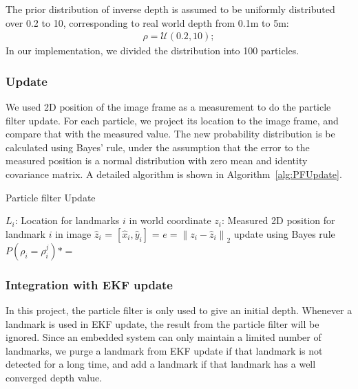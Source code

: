 \documentclass[conference]{IEEEtran}
\newcommand{\norm}[1]{\left\lVert#1\right\rVert}
\begin{document}
The prior distribution of inverse depth is assumed to be uniformly distributed over 0.2 to 10, corresponding to real world depth from 0.1m to 5m:
\begin{align*}
	\rho = \mathcal{U}(0.2, 10);
\end{align*}
In our implementation, we divided the distribution into 100 particles.

\subsubsection{Update}
We used 2D position of the image frame as a measurement to do the particle filter update. For each particle, we project its location to the image frame, and compare that with the measured value.
The new probability distribution is be calculated using Bayes' rule, under the assumption that the error to the measured position is a normal distribution with zero mean and identity covariance matrix.
A detailed algorithm is shown in Algorithm~\ref{alg:PFUpdate}.

\begin{algorithm}[H]
\caption{Particle filter Update}
\label{alg:PFUpdate}
    \begin{algorithmic}
    	\Statex {} {$L_i$: Location for landmarks $i$ in world coordinate}
        \Statex {} {$z_i$: Measured 2D position for landmark $i$ in image}
            		\State $\hat{z}_i$ = $[\hat{x}_i,\hat{y}_i]$ = 
                    \State $e = \norm{z_i-\hat{z}_i}_2$
                    \Statex {} {update using Bayes rule}
                    \State $P(\rho_i=\rho_i^j)*=$
            	\EndFor
                \State {}
                \State {}
        	\EndIf
    	\EndFor
    \EndFunction
    \end{algorithmic}
\end{algorithm}

\subsubsection{Integration with EKF update}
In this project, the particle filter is only used to give an initial depth. Whenever a landmark is used in EKF update, the result from the particle filter will be ignored. Since an embedded system can only maintain a limited number of landmarks, we purge a landmark from EKF update if that landmark is not detected for a long time, and add a landmark if that landmark has a well converged depth value. 
\end{document}
